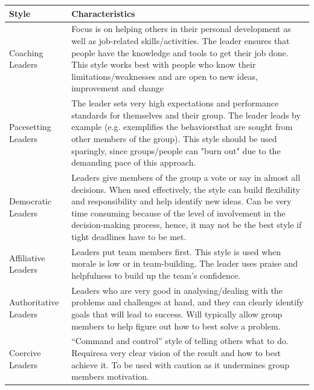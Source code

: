 \documentclass[]{project_plan}
\begin{document}
\begin{tabular}{|p{30mm}|p{115mm}|}
  \hline
  Style                 & Characteristics                                                                                                                                                                                                                                                                                                                                       \\
  \hline
  Coaching Leaders      & Focus is on helping others in their personal development as well as job-related skills/activities. The leader ensures that people have the knowledge and tools to get their job done. This style works best with people who know their limitations/weaknesses and are open to new ideas, improvement and change                                       \\
  \hline
  Pacesetting Leaders   & The leader sets very high expectations and performance standards for themselves and their group. The leader leads by example (e.g. exemplifies the behaviorsthat are sought from other members of the group). This style should be used sparingly, since groups/people can  "burn out" due to the demanding pace of this approach.                    \\
  \hline
  Democratic Leaders    & Leaders give members of the group a vote or say in almost all decisions. When used effectively, the style can build flexibility and responsibility and help identify new ideas. Can be very time consuming because of the level of involvement in the decision-making process, hence, it may not be the best style if tight deadlines have to be met. \\
  \hline
  Affiliative Leaders   & Leaders put team members first. This style is used when morale is low or in team-building. The leader uses praise and helpfulness to build up the team’s confidence.                                                                                                                                                                                  \\
  \hline
  Authoritative Leaders & Leaders who are very good in analysing/dealing with the problems and challenges at hand, and they can clearly identify goals that will lead to success. Will typically allow group members to help figure out how to best solve a problem.                                                                                                            \\
  \hline
  Coercive Leaders      & “Command and control” style of telling others what to do. Requiresa very clear vision of the result and how to best achieve it. To be used with caution as it undermines group members motivation.                                                                                                                                                    \\
  \hline
\end{tabular}
\end{document}
